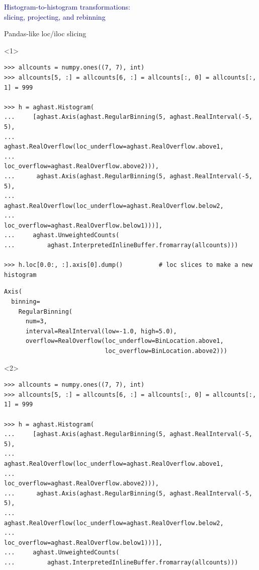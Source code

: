 \documentclass[aspectratio=169]{beamer}
\begin{document}
\begin{frame}{}
\LARGE
\begin{center}
\textcolor{darkblue}{Histogram-to-histogram transformations: \\ slicing, projecting, and rebinning}
\end{center}
\end{frame}

\begin{frame}[fragile]{Pandas-like loc/iloc slicing}
\scriptsize
\vspace{0.4 cm}
\begin{onlyenv}<1>
\begin{verbatim}
>>> allcounts = numpy.ones((7, 7), int)
>>> allcounts[5, :] = allcounts[6, :] = allcounts[:, 0] = allcounts[:, 1] = 999

>>> h = aghast.Histogram(
...     [aghast.Axis(aghast.RegularBinning(5, aghast.RealInterval(-5, 5),
...                  aghast.RealOverflow(loc_underflow=aghast.RealOverflow.above1,
...                                      loc_overflow=aghast.RealOverflow.above2))),
...      aghast.Axis(aghast.RegularBinning(5, aghast.RealInterval(-5, 5),
...                  aghast.RealOverflow(loc_underflow=aghast.RealOverflow.below2,
...                                      loc_overflow=aghast.RealOverflow.below1)))],
...     aghast.UnweightedCounts(
...         aghast.InterpretedInlineBuffer.fromarray(allcounts)))

>>> h.loc[0.0:, :].axis[0].dump()          # loc slices to make a new histogram
\end{verbatim}
\begin{verbatim}
Axis(
  binning=
    RegularBinning(
      num=3,
      interval=RealInterval(low=-1.0, high=5.0),
      overflow=RealOverflow(loc_underflow=BinLocation.above1,
                            loc_overflow=BinLocation.above2)))
\end{verbatim}
\end{onlyenv}
\begin{onlyenv}<2>
\begin{verbatim}
>>> allcounts = numpy.ones((7, 7), int)
>>> allcounts[5, :] = allcounts[6, :] = allcounts[:, 0] = allcounts[:, 1] = 999

>>> h = aghast.Histogram(
...     [aghast.Axis(aghast.RegularBinning(5, aghast.RealInterval(-5, 5),
...                  aghast.RealOverflow(loc_underflow=aghast.RealOverflow.above1,
...                                      loc_overflow=aghast.RealOverflow.above2))),
...      aghast.Axis(aghast.RegularBinning(5, aghast.RealInterval(-5, 5),
...                  aghast.RealOverflow(loc_underflow=aghast.RealOverflow.below2,
...                                      loc_overflow=aghast.RealOverflow.below1)))],
...     aghast.UnweightedCounts(
...         aghast.InterpretedInlineBuffer.fromarray(allcounts)))


\end{verbatim}
\end{onlyenv}
\end{frame}
\end{document}
